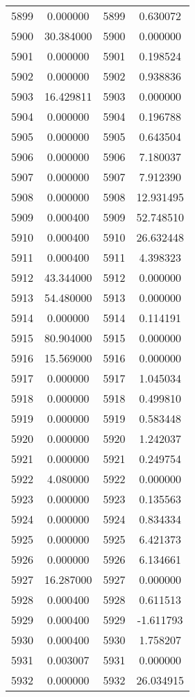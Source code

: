 \documentclass[12pt]{article}
\begin{document}
\begin{longtable}{@{}cccc@{}}
5899 & 0.000000 & 5899 & 0.630072 \\
5900 & 30.384000 & 5900 & 0.000000 \\
5901 & 0.000000 & 5901 & 0.198524 \\
5902 & 0.000000 & 5902 & 0.938836 \\
5903 & 16.429811 & 5903 & 0.000000 \\
5904 & 0.000000 & 5904 & 0.196788 \\
5905 & 0.000000 & 5905 & 0.643504 \\
5906 & 0.000000 & 5906 & 7.180037 \\
5907 & 0.000000 & 5907 & 7.912390 \\
5908 & 0.000000 & 5908 & 12.931495 \\
5909 & 0.000400 & 5909 & 52.748510 \\
5910 & 0.000400 & 5910 & 26.632448 \\
5911 & 0.000400 & 5911 & 4.398323 \\
5912 & 43.344000 & 5912 & 0.000000 \\
5913 & 54.480000 & 5913 & 0.000000 \\
5914 & 0.000000 & 5914 & 0.114191 \\
5915 & 80.904000 & 5915 & 0.000000 \\
5916 & 15.569000 & 5916 & 0.000000 \\
5917 & 0.000000 & 5917 & 1.045034 \\
5918 & 0.000000 & 5918 & 0.499810 \\
5919 & 0.000000 & 5919 & 0.583448 \\
5920 & 0.000000 & 5920 & 1.242037 \\
5921 & 0.000000 & 5921 & 0.249754 \\
5922 & 4.080000 & 5922 & 0.000000 \\
5923 & 0.000000 & 5923 & 0.135563 \\
5924 & 0.000000 & 5924 & 0.834334 \\
5925 & 0.000000 & 5925 & 6.421373 \\
5926 & 0.000000 & 5926 & 6.134661 \\
5927 & 16.287000 & 5927 & 0.000000 \\
5928 & 0.000400 & 5928 & 0.611513 \\
5929 & 0.000400 & 5929 & -1.611793 \\
5930 & 0.000400 & 5930 & 1.758207 \\
5931 & 0.003007 & 5931 & 0.000000 \\
5932 & 0.000000 & 5932 & 26.034915 \\

\end{longtable}
\end{document}
